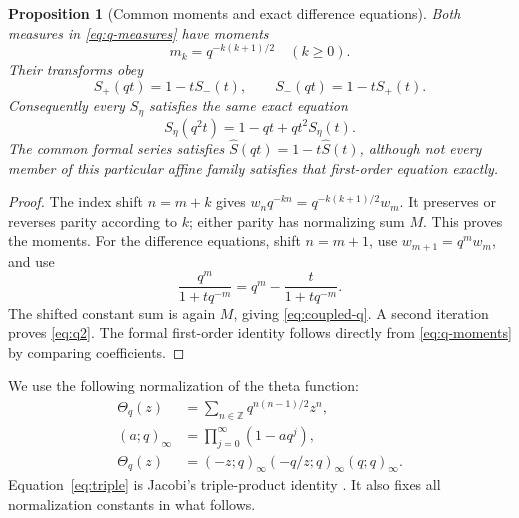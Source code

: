 \documentclass[11pt,a4paper]{article}
\numberwithin{equation}{section}
\newtheorem{proposition}[theorem]{Proposition}
\theoremstyle{definition}
\theoremstyle{remark}
\newcommand{\Z}{\mathbb Z}
\begin{document}
\begin{proposition}[Common moments and exact difference equations]
\label{prop:q-moments}
Both measures in \eqref{eq:q-measures} have moments
\begin{equation}
 m_k=q^{-k(k+1)/2}\quad(k\ge0).
 \label{eq:q-moments}
\end{equation}
Their transforms obey
\begin{equation}
 S_+(qt)=1-tS_-(t),\qquad S_-(qt)=1-tS_+(t).
 \label{eq:coupled-q}
\end{equation}
Consequently every \(S_\eta\) satisfies the same exact equation
\begin{equation}
 S_\eta(q^2t)=1-qt+qt^2S_\eta(t).
 \label{eq:q2}
\end{equation}
The common formal series satisfies
\(\widehat S(qt)=1-t\widehat S(t)\), although not every member of this
particular affine family satisfies that first-order equation exactly.
\end{proposition}
\begin{proof}
The index shift \(n=m+k\) gives
\(w_nq^{-kn}=q^{-k(k+1)/2}w_m\).
It preserves or reverses parity according to \(k\); either parity has
normalizing sum \(M\). This proves the moments. For the difference
equations, shift \(n=m+1\), use \(w_{m+1}=q^mw_m\), and use
\[
 \frac{q^m}{1+tq^{-m}}=q^m-\frac{t}{1+tq^{-m}}.
\]
The shifted constant sum is again \(M\), giving
\eqref{eq:coupled-q}. A second iteration proves \eqref{eq:q2}.
The formal first-order identity follows directly from
\eqref{eq:q-moments} by comparing coefficients.
\end{proof}

We use the following normalization of the theta function:
\begin{align}
 \Theta_q(z)&=\sum_{n\in\Z}q^{n(n-1)/2}z^n,\label{eq:theta}\\
 (a;q)_\infty&=\prod_{j=0}^\infty(1-aq^j),\nonumber\\
 \Theta_q(z)&=(-z;q)_\infty(-q/z;q)_\infty(q;q)_\infty.
 \label{eq:triple}
\end{align}
Equation~\eqref{eq:triple} is Jacobi's triple-product identity
\cite{dlmf}. It also fixes all normalization constants in what follows.
\end{document}
